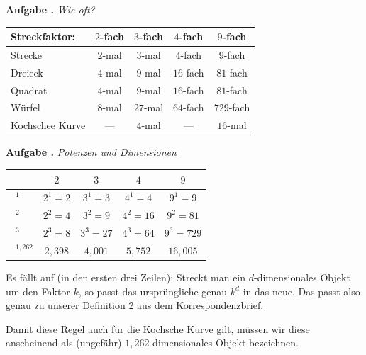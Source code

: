 \documentclass[a4paper,ngerman,12pt]{scrartcl}
\theoremstyle{definition}
\theoremstyle{plain}
\theoremstyle{remark}
\newlength{\aufgabenskip}
\newcounter{aufgabennummer}
\newenvironment{aufgabe}[1]{
  \addtocounter{aufgabennummer}{1}
  \textbf{Aufgabe \theaufgabennummer.} \emph{#1} \par
}{\vspace{\aufgabenskip}}
\begin{document}
\newpage

\begin{aufgabe}{Wie oft?} \label{aufgabe:Wie_oft}
\begin{center}
	\renewcommand{\arraystretch}{2}
	\begin{tabular}{l||c|c|c|c}
		Streckfaktor:& $2$-fach & $3$-fach & $4$-fach & $9$-fach \\\hline\hline
		Strecke      & $2$-mal	& $3$-mal  & $4$-fach & $9$-fach \\\hline
		Dreieck      & $4$-mal  & $9$-mal  & $16$-fach & $81$-fach \\\hline
		Quadrat      & $4$-mal  & $9$-mal  & $16$-fach & $81$-fach  \\\hline
		Würfel       & $8$-mal  & $27$-mal  & $64$-fach & $729$-fach  \\\hline
		Kochschee Kurve & ---   & $4$-mal  & ---      & $16$-mal  \\      	
	\end{tabular}
\end{center}
\end{aufgabe}

\begin{aufgabe}{Potenzen und Dimensionen}
\begin{center}
	\renewcommand{\arraystretch}{2}
	\begin{tabular}{l||c|c|c|c}
				      & $2$ & $3$ & $4$ & $9$ \\\hline\hline
		$\boxed{\phantom{1}}^1$  & $2^1=2$	& $3^1=3$ & $4^1=4$  & $9^1=9$ \\\hline
		$\boxed{\phantom{1}}^2$  & $2^2=4$	& $3^2=9$ & $4^2=16$ & $9^2=81$\\\hline
		$\boxed{\phantom{1}}^3$  & $2^3=8$	& $3^3=27$ & $4^3=64$ & $9^3=729$ \\\hline
		$\boxed{\phantom{1}}^{1,262}$  & $2,398$ & $4,001$ & $5,752$ & $16,005$     	
	\end{tabular}
\end{center}

Es fällt auf (in den ersten drei Zeilen): Streckt man ein $d$-dimensionales Objekt um den Faktor $k$, so passt das ursprüngliche genau $k^d$ in das neue. Das passt also genau zu unserer Definition 2 aus dem Korrespondenzbrief.

Damit diese Regel auch für die Kochsche Kurve gilt, müssen wir diese anscheinend als (ungefähr) $1,262$-dimensionales Objekt bezeichnen.

\end{aufgabe}
\end{document}
